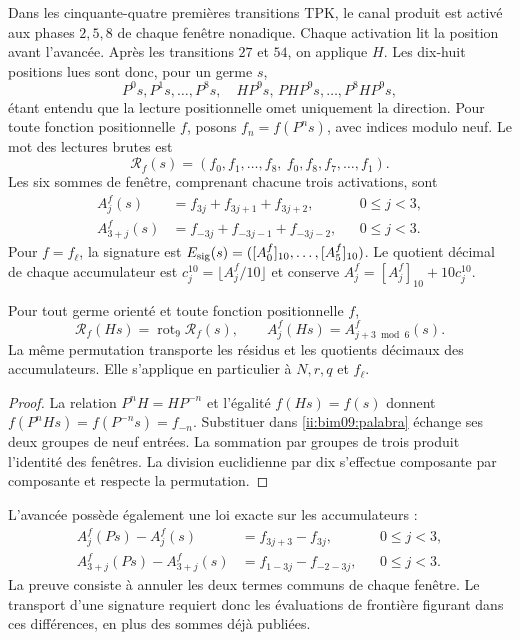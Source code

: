 Dans les cinquante-quatre premières transitions TPK, le canal produit
est activé aux phases $2,5,8$ de chaque fenêtre nonadique. Chaque activation
lit la position avant l'avancée. Après les transitions $27$ et $54$,
on applique $H$. Les dix-huit positions lues sont donc, pour un
germe $s$,
\[
 P^0s,P^1s,\ldots,P^8s,\quad
 HP^9s,\,P H P^9s,\ldots,P^8H P^9s,
\]
étant entendu que la lecture positionnelle omet uniquement la direction.
Pour toute fonction positionnelle $f$, posons $f_n=f(P^ns)$, avec
indices modulo neuf. Le mot des lectures brutes est
\begin{equation}
 \mathcal R_f(s)=
 (f_0,f_1,\ldots,f_8,\ f_0,f_8,f_7,\ldots,f_1).
 \label{ii:bim09:palabra}
\end{equation}
Les six sommes de fenêtre, comprenant chacune trois activations, sont
\begin{align}
 A_j^f(s)&=f_{3j}+f_{3j+1}+f_{3j+2},&&0\leq j<3,\label{ii:bim09:ida}\\
 A_{3+j}^f(s)&=f_{-3j}+f_{-3j-1}+f_{-3j-2},&&0\leq j<3.
 \label{ii:bim09:vuelta}
\end{align}
Pour $f=f_\ell$, la signature est
$E_{\rm sig}(s)=([A_0^f]_{10},\ldots,[A_5^f]_{10})$.
Le quotient décimal de chaque accumulateur est
$c_j^{10}=\lfloor A_j^f/10\rfloor$ et conserve
$A_j^f=[A_j^f]_{10}+10c_j^{10}$.

\begin{proposition}
\label{ii:bim09:media-vuelta}
Pour tout germe orienté et toute fonction positionnelle $f$,
\[
 \mathcal R_f(Hs)=\operatorname{rot}_9\mathcal R_f(s),\qquad
 A_j^f(Hs)=A_{j+3\bmod6}^f(s).
\]
La même permutation transporte les résidus et les quotients décimaux
des accumulateurs. Elle s'applique en particulier à $N,r,q$ et $f_\ell$.
\end{proposition}
\begin{proof}
La relation $P^nH=HP^{-n}$ et l'égalité $f(Hs)=f(s)$ donnent
$f(P^nHs)=f(P^{-n}s)=f_{-n}$. Substituer dans
\eqref{ii:bim09:palabra} échange ses deux groupes de neuf entrées.
La sommation par groupes de trois produit l'identité des fenêtres. La division
euclidienne par dix s'effectue composante par composante et respecte la
permutation.
\end{proof}

L'avancée possède également une loi exacte sur les accumulateurs :
\begin{align}
 A_j^f(Ps)-A_j^f(s)&=f_{3j+3}-f_{3j},&&0\leq j<3,
 \label{ii:bim09:avance-ida}\\
 A_{3+j}^f(Ps)-A_{3+j}^f(s)&=f_{1-3j}-f_{-2-3j},&&0\leq j<3.
 \label{ii:bim09:avance-vuelta}
\end{align}
La preuve consiste à annuler les deux termes communs de chaque fenêtre.
Le transport d'une signature requiert donc les évaluations de
frontière figurant dans ces différences, en plus des sommes déjà
publiées.

